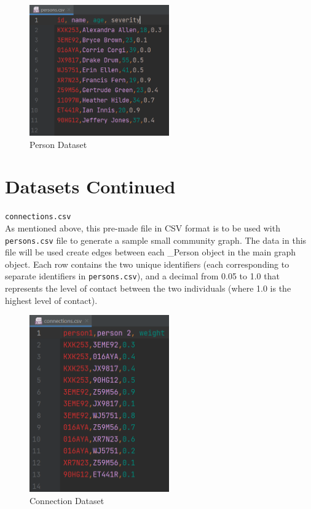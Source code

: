 \documentclass[fontsize=11pt]{article}
\newcommand{\ttt}[1]{\texttt{#1}}
\begin{document}
\begin{figure}[h]
    \centering
    \includegraphics[width=60mm,scale=0.3]{pictures/person_dataset.png}
    \caption{Person Dataset}
\end{figure}
\newpage
\section*{Datasets Continued}
\ttt{connections.csv} \\
As mentioned above, this pre-made file in CSV format is to be used with \ttt{persons.csv} file to generate a sample small community graph. The data in this file will be used create edges between each \_Person object in the main graph object. Each row contains the two unique identifiers (each corresponding to separate identifiers in \ttt{persons.csv}), and a decimal from 0.05 to 1.0 that represents the level of contact between the two individuals (where 1.0 is the highest level of contact).

\begin{figure}[h]
    \centering
    \includegraphics[width=60mm,scale=0.3]{pictures/connections_dataset.png}
    \caption{Connection Dataset}
\end{figure}


\newpage
\end{document}
